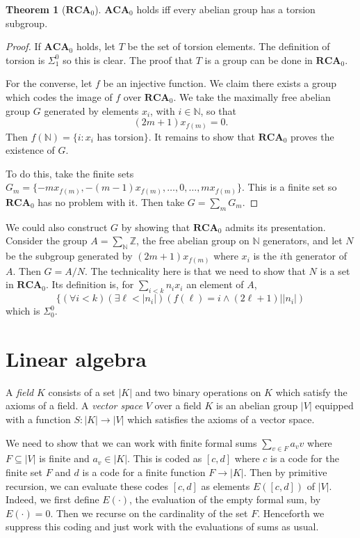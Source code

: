 \documentclass[12pt]{book}
\newcommand{\NN}{\mathbb{N}}
\newcommand{\ZZ}{\mathbb{Z}}
\newcommand{\ACA}{\mathbf{ACA}}
\newcommand{\RCA}{\mathbf{RCA}}
\newcommand{\dfn}[1]{\emph{#1}\index{#1}}
\theoremstyle{definition}
\newtheorem{theorem}{Theorem}[chapter]
\newenvironment{definition}
  {\pushQED{\qed}\renewcommand{\qedsymbol}{$\diamondsuit$}\definitionx}
  {\popQED\endexamplex}
\begin{document}
\begin{theorem}[$\RCA_0$]
$\ACA_0$ holds iff every abelian group has a torsion subgroup.
\end{theorem}
\begin{proof}
If $\ACA_0$ holds, let $T$ be the set of torsion elements.
The definition of torsion is $\Sigma_1^0$ so this is clear.
The proof that $T$ is a group can be done in $\RCA_0$.

For the converse, let $f$ be an injective function.
We claim there exists a group which codes the image of $f$ over $\RCA_0$.
We take the maximally free abelian group $G$ generated by elements $x_i$, with $i \in \NN$, so that
$$(2m + 1)x_{f(m)} = 0.$$
Then $f(\NN) = \{i: x_i \text{ has torsion}\}$.
It remains to show that $\RCA_0$ proves the existence of $G$.

To do this, take the finite sets $G_m = \{-mx_{f(m)}, -(m-1)x_{f(m)}, \dots, 0, \dots, mx_{f(m)}\}$.
This is a finite set so $\RCA_0$ has no problem with it.
Then take $G = \sum_m G_m$.
\end{proof}

We could also construct $G$ by showing that $\RCA_0$ admits its presentation.
Consider the group $A = \sum_\NN \ZZ$, the free abelian group on $\NN$ generators, and let $N$ be the subgroup generated by $(2m+1)x_{f(m)}$ where $x_i$ is the $i$th generator of $A$.
Then $G = A/N$.
The technicality here is that we need to show that $N$ is a set in $\RCA_0$.
Its definition is, for $\sum_{i < k} n_i x_i$ an element of $A$,
$$\{(\forall i < k)(\exists \ell < |n_i|)(f(\ell) = i \wedge (2\ell + 1)||n_i|)$$
which is $\Sigma_0^0$.

\section{Linear algebra}
\begin{definition}[$\RCA_0$]
A \dfn{field} $K$ consists of a set $|K|$ and two binary operations on $K$ which satisfy the axioms of a field.
A \dfn{vector space} $V$ over a field $K$ is an abelian group $|V|$ equipped with a function $S: |K| \to |V|$ which satisfies the axioms of a vector space.
\end{definition}

We need to show that we can work with finite formal sums $\sum_{v \in F} a_v v$ where $F \subseteq |V|$ is finite and $a_v \in |K|$.
This is coded as $[c, d]$ where $c$ is a code for the finite set $F$ and $d$ is a code for a finite function $F \to |K|$.
Then by primitive recursion, we can evaluate these codes $[c, d]$ as elements $E([c, d])$ of $|V|$.
Indeed, we first define $E(\cdot)$, the evaluation of the empty formal sum, by $E(\cdot) = 0$.
Then we recurse on the cardinality of the set $F$.
Henceforth we suppress this coding and just work with the evaluations of sums as usual.
\end{document}
